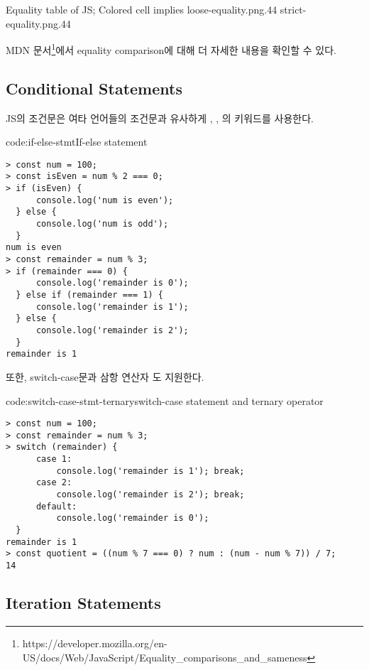     {Equality table of JS; Colored cell implies \protect\footnotemark}{
        {loose-equality.png}{.44}
        {strict-equality.png}{.44}
}


MDN 문서\footnote{https://developer.mozilla.org/en-US/docs/Web/JavaScript/Equality\_comparisons\_and\_sameness}에서 equality comparison에 대해 더 자세한 내용을 확인할 수 있다.

\subsection*{Conditional Statements}

JS의 조건문은 여타 언어들의 조건문과 유사하게 , , 의 키워드를 사용한다.

\begin{codeenv}{code:if-else-stmt}{If-else statement}\begin{verbatim}
> const num = 100;
> const isEven = num % 2 === 0;
> if (isEven) {
      console.log('num is even');
  } else {
      console.log('num is odd');
  }
num is even
> const remainder = num % 3;
> if (remainder === 0) {
      console.log('remainder is 0');
  } else if (remainder === 1) {
      console.log('remainder is 1');
  } else {
      console.log('remainder is 2');
  }
remainder is 1
\end{verbatim}
\end{codeenv}

또한, switch-case문과 삼항 연산자 도 지원한다.

\begin{codeenv}{code:switch-case-stmt-ternary}{switch-case statement and ternary operator}\begin{verbatim}
> const num = 100;
> const remainder = num % 3;
> switch (remainder) {
      case 1:
          console.log('remainder is 1'); break;
      case 2:
          console.log('remainder is 2'); break;
      default:
          console.log('remainder is 0');
  }
remainder is 1
> const quotient = ((num % 7 === 0) ? num : (num - num % 7)) / 7;
14
\end{verbatim}
\end{codeenv}

\subsection*{Iteration Statements}

